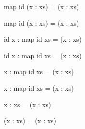 \documentclass{beamer}
\newcommand{\ca}[1]{{\color{blue}#1}}
\newcommand{\cb}[1]{{\color{violet}#1}}
\newcommand{\cc}[1]{{\color{red}#1}}
\begin{document}
\begin{frame}[t,fragile]
\begin{center}
\begin{overprint}
\begin{semiverbatim}
map id (x : xs)    = (x : xs)
\end{semiverbatim}

\begin{semiverbatim}
map \ca{id} (\cb{x} : \cc{xs})    = (x : xs)
\end{semiverbatim}

\begin{semiverbatim}
\ca{id} \cb{x} : map \ca{id} \cc{xs}   = (x : xs)
\end{semiverbatim}

\begin{semiverbatim}
\alert{id x} : map id xs   = (x : xs)
\end{semiverbatim}

\begin{semiverbatim}
\alert{x}    : map id xs   = (x : xs)
\end{semiverbatim}

\begin{semiverbatim}
x    : \alert{map id xs}   = (x : xs)
\end{semiverbatim}

\begin{semiverbatim}
x    : \alert{xs}          = (x : xs)
\end{semiverbatim}

\begin{semiverbatim}
\alert<26>{(x    : xs)}        = \alert<26>{(x : xs)}
\end{semiverbatim}

\end{overprint}
\end{center}

\end{frame}
\end{document}
